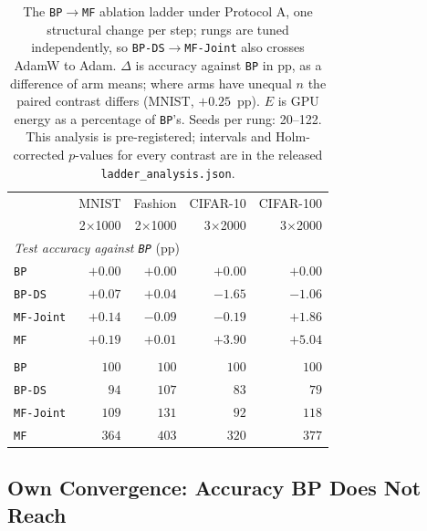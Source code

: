 \documentclass{llncs}
\newcommand{\MF}{\texttt{MF}}
\newcommand{\BP}{\texttt{BP}}
\newcommand{\BPDS}{\texttt{BP-DS}}
\newcommand{\MFJ}{\texttt{MF-Joint}}
\begin{document}
\begin{table}[tb]
  \centering
  \caption{The \BP{}$\rightarrow$\MF{} ablation ladder under Protocol A, one
    structural change per step; rungs are tuned independently, so
    \BPDS{}$\rightarrow$\MFJ{} also crosses AdamW to Adam. $\Delta$ is accuracy
    against \BP{} in pp, as a difference of arm means; where arms have unequal
    $n$ the paired contrast differs (MNIST, $+\num{0.25}$~pp). $E$ is GPU
    energy as a percentage of \BP{}'s. Seeds per rung: \numrange{20}{122}. This analysis is pre-registered; intervals and
    Holm-corrected $p$-values for every contrast are in the released
    \texttt{ladder\_analysis.json}.}
  \label{tab:ladder}
  \setlength{\tabcolsep}{5pt}
  \footnotesize
  \begin{tabular}{lrrrr}
    \toprule
    & MNIST & Fashion & CIFAR-10 & CIFAR-100 \\
    & 2$\times$1000 & 2$\times$1000 & 3$\times$2000 & 3$\times$2000 \\
    \midrule
    \multicolumn{5}{l}{\emph{Test accuracy against \BP{}} (pp)} \\
    \quad \BP{} & $+0.00$ & $+0.00$ & $+0.00$ & $+0.00$ \\
    \quad \BPDS{} & $+0.07$ & $+0.04$ & $-1.65$ & $-1.06$ \\
    \quad \MFJ{} & $+0.14$ & $-0.09$ & $-0.19$ & $+1.86$ \\
    \quad \MF{} & $+0.19$ & $+0.01$ & $+3.90$ & $+5.04$ \\
    \addlinespace[2pt]
    \multicolumn{5}{l}{\emph{GPU energy} (\% of \BP{})} \\
    \quad \BP{} & $100$ & $100$ & $100$ & $100$ \\
    \quad \BPDS{} & $94$ & $107$ & $83$ & $79$ \\
    \quad \MFJ{} & $109$ & $131$ & $92$ & $118$ \\
    \quad \MF{} & $364$ & $403$ & $320$ & $377$ \\
    \bottomrule
  \end{tabular}
\end{table}

\subsection{Own Convergence: Accuracy BP Does Not Reach}
\label{sec:convergence}
\end{document}
